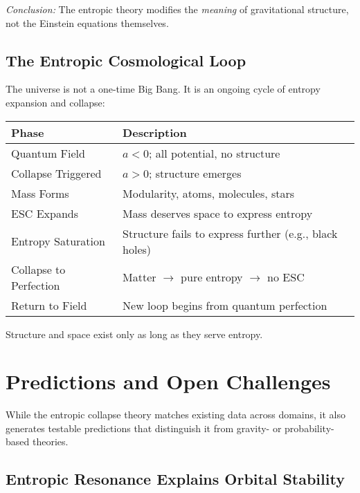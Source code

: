 \documentclass[12pt]{article}
\begin{document}
\textit{Conclusion:} The entropic theory modifies the \textit{meaning} of gravitational structure, not the Einstein equations themselves.

\subsection{The Entropic Cosmological Loop}

The universe is not a one-time Big Bang. It is an ongoing cycle of entropy expansion and collapse:

\vspace{1em}
\begin{center}
\begin{tabular}{|l|p{10.5cm}|}
\hline
\textbf{Phase} & \textbf{Description} \\
\hline
Quantum Field & $a < 0$; all potential, no structure \\
\hline
Collapse Triggered & $a > 0$; structure emerges \\
\hline
Mass Forms & Modularity, atoms, molecules, stars \\
\hline
ESC Expands & Mass deserves space to express entropy \\
\hline
Entropy Saturation & Structure fails to express further (e.g., black holes) \\
\hline
Collapse to Perfection & Matter $\rightarrow$ pure entropy $\rightarrow$ no ESC \\
\hline
Return to Field & New loop begins from quantum perfection \\
\hline
\end{tabular}
\end{center}
\vspace{1em}

Structure and space exist only as long as they serve entropy.

\section{Predictions and Open Challenges}

While the entropic collapse theory matches existing data across domains, it also generates testable predictions that distinguish it from gravity- or probability-based theories.

\subsection{Entropic Resonance Explains Orbital Stability}
\end{document}
